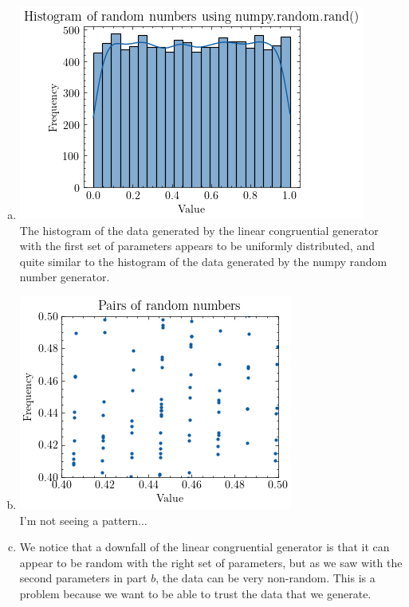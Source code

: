 \documentclass{article}
\begin{document}
\begin{enumerate}[(a)]
    \item
        \includegraphics[scale=0.7]{imgs/1d.png} \\ 
        The histogram of the data generated by the linear congruential generator with the first set of parameters
        appears to be uniformly distributed, and quite similar to the histogram of the data generated by the
        numpy random number generator. 

    \item
        \includegraphics[scale=0.7]{imgs/pairs.png} \\
        I'm not seeing a pattern...

    \item
        We notice that a downfall of the linear congruential generator is that it can appear to be random with the
        right set of parameters, but as we saw with the second parameters in part $b$, the data can be very non-random.
        This is a problem because we want to be able to trust the data that we generate.
\end{enumerate}
\end{document}
